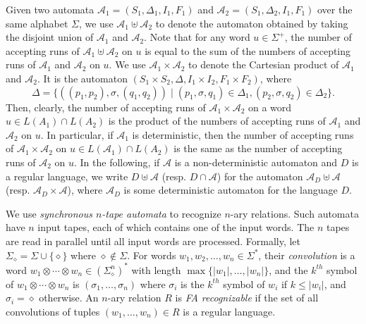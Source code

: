 \documentclass[envcountsame]{llncs}
\newcommand{\A}{\mathcal A}
\begin{document}
Given two automata $\A_1 = (S_1, \Delta_1, I_1, F_1)$ and $\A_2 = (S_1, \Delta_2, I_1, F_1)$ over the same alphabet 
$\Sigma$, we use $\A_1\uplus \A_2$ to denote the automaton obtained 
by taking the disjoint union of $\A_1$ and $\A_2$. Note that for any word $u \in \Sigma^+$, the number of 
accepting runs of $\A_1\uplus \A_2$ on $u$ is equal to the sum of the numbers of accepting runs of $\A_1$ and  $\A_2$ on $u$.
We use $\A_1\times \A_2$ to denote the Cartesian product of $\A_1$ and $\A_2$.
It is the automaton $(S_1 \times S_2, \Delta, I_1 \times I_2, F_1 \times F_2)$, where
$$
\Delta = \{ ((p_1,p_2),\sigma, (q_1,q_2)) \mid (p_1,\sigma,q_1) \in \Delta_1, (p_2,\sigma,q_2) \in \Delta_2\}.
$$
Then, clearly, the number of accepting runs of $\A_1 \times \A_2$ on a word 
$u \in L(A_1) \cap L(A_2)$ is the product of the numbers of accepting runs 
of $\A_1$ and  $\A_2$ on $u$.
In particular, if $\A_1$ is deterministic, then 
the number of accepting runs of 
$\A_1\times \A_2$ on $u\in L(\A_1) \cap L(A_2)$ is the same as the number of accepting runs of $\A_2$ on $u$.
In the following, if $\A$ is a non-deterministic automaton 
and $D$ is a regular language, we write
$D \uplus \A$ (resp. $D \cap \A$)
for the automaton $\A_D \uplus \A$ (resp. $\A_D \times \A$), where 
$\A_D$ is some deterministic automaton for the language $D$.


We use {\em synchronous $n$-tape automata} to recognize 
$n$-ary relations. Such automata have $n$ input tapes, each of which
contains one of the input words. The $n$ tapes are read in parallel until all input words are processed.
Formally, let $\Sigma_\diamond = \Sigma \cup \{\diamond\}$ where $\diamond
\notin \Sigma$. For words $w_1,w_2,\ldots,w_n \in \Sigma^{*}$, their {\em convolution} is a word
$w_1\otimes \cdots \otimes w_n \in (\Sigma_\diamond^n)^*$ with length $\max\{|w_1|,\ldots,|w_n|\}$, and the $k^{th}$ symbol of
$w_1\otimes\cdots \otimes w_n$ is $(\sigma_1,\ldots,\sigma_n)$ where
$\sigma_i$ is the $k^{th}$ symbol of $w_i$ if $k \leq |w_i|$, and
$\sigma_i=\diamond$ otherwise. An $n$-ary relation $R$ is
\emph{FA recognizable} if the set of all convolutions of tuples
$(w_1,\ldots,w_n)\in R$ is a regular
language.
\end{document}
